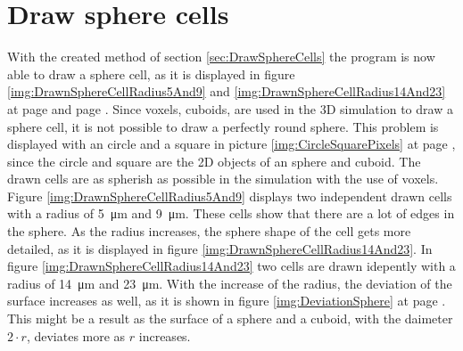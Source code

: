 \section{Draw sphere cells}
With the created method of section \ref{sec:DrawSphereCells} the program is now able to draw a sphere cell, as it is displayed in figure \ref{img:DrawnSphereCellRadius5And9} and \ref{img:DrawnSphereCellRadius14And23} at page \pageref{img:DrawnSphereCellRadius5And9} and page \pageref{img:DrawnSphereCellRadius14And23}. \newline
Since voxels, cuboids, are used in the 3D simulation to draw a sphere cell, it is not possible to draw a perfectly round sphere. This problem is displayed with an circle and a square in picture \ref{img:CircleSquarePixels} at page \pageref{img:CircleSquarePixels}, since the circle and square are the 2D objects of an sphere and cuboid. The drawn cells are as spherish as possible in the simulation with the use of voxels. \newline
Figure \ref{img:DrawnSphereCellRadius5And9} displays two independent drawn cells with a radius of \SI{5}{\micro\metre} and \SI{9}{\micro\metre}. These cells show that there are a lot of edges in the sphere. As the radius increases, the sphere shape of the cell gets more detailed, as it is displayed in figure \ref{img:DrawnSphereCellRadius14And23}. In figure \ref{img:DrawnSphereCellRadius14And23} two cells are drawn idepently with a radius of \SI{14}{\micro\metre} and \SI{23}{\micro\metre}. With the increase of the radius, the deviation of the surface increases as well, as it is shown in figure \ref{img:DeviationSphere} at page \pageref{img:DeviationSphere}. This might be a result as the surface of a sphere and a cuboid, with the daimeter $2 \cdot r$, deviates more as $r$ increases.

